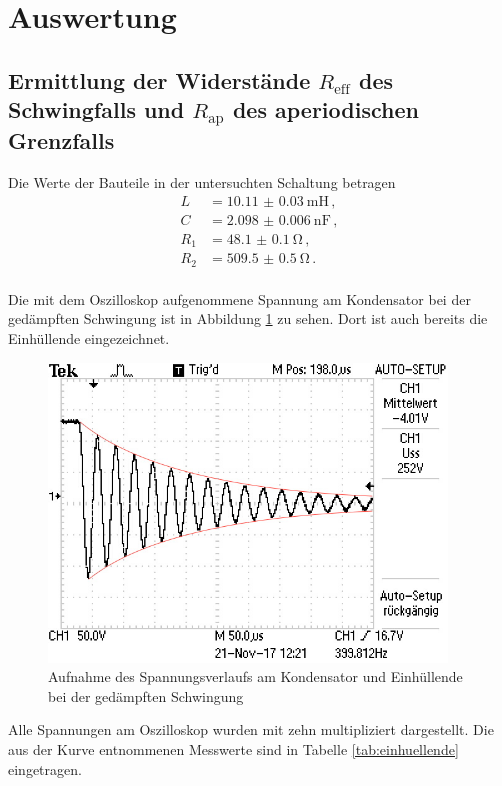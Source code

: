 \section{Auswertung}
\label{sec:Auswertung}
\subsection{Ermittlung der Widerstände $R_\text{eff}$ des Schwingfalls und $R_\text{ap}$ des aperiodischen Grenzfalls}
Die Werte der Bauteile in der untersuchten Schaltung betragen
\begin{align*}
  L &= \SI{10.11(003)}{\milli\henry}\,, \\
  C &= \SI{2.098(0006)}{\nano\farad}\,, \\
  R_1 &= \SI{48.1(01)}{\ohm}\,, \\
  R_2 &= \SI{509.5(05)}{\ohm}\,. \\
\end{align*}

Die mit dem Oszilloskop aufgenommene Spannung am Kondensator bei der gedämpften
Schwingung ist in Abbildung \ref{fig:einhuellende} zu sehen. Dort ist auch
bereits die Einhüllende eingezeichnet.

\begin{figure}
  \centering
  \includegraphics[width=300pt]{data/gedaempfte_schwingung2.JPG}
  \caption{Aufnahme des Spannungsverlaufs am Kondensator und Einhüllende bei der
  gedämpften Schwingung}
  \label{fig:einhuellende}
\end{figure}

Alle Spannungen am Oszilloskop wurden mit zehn multipliziert dargestellt. Die
aus der Kurve entnommenen Messwerte sind in Tabelle \ref{tab:einhuellende} eingetragen.

